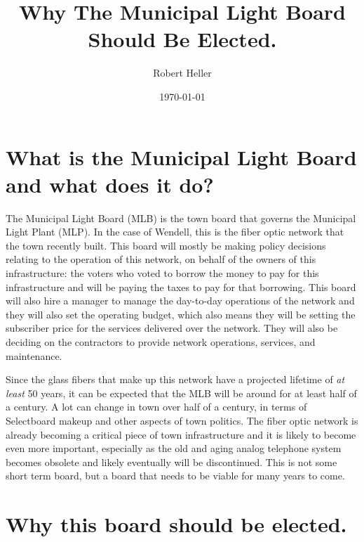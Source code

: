 \documentclass[12pt]{article}
\title{Why The Municipal Light Board Should Be Elected.}
\author{Robert Heller}
\date{\today}
\begin{document}
        
\maketitle

\tableofcontents

\section{What is the Municipal Light Board and what does it do?}

The Municipal Light Board (MLB) is the town board that governs the Municipal
Light Plant (MLP). In the case of Wendell, this is the fiber optic network
that the town recently built. This board will mostly be making policy decisions
relating to the operation of this network, on behalf of the owners of this
infrastructure: the voters who voted to borrow the money to pay for this
infrastructure and will be paying the taxes to pay for that borrowing. This
board will also hire a manager to manage the day-to-day operations of the
network and they will also set the operating budget, which also means they
will be setting the subscriber price for the services delivered over the
network. They will also be deciding on the contractors to provide network 
operations, services, and maintenance.

Since the glass fibers that make up this network have a projected lifetime of
\textit{at least} 50 years, it can be expected that the MLB will be around for
at least half of a century. A lot can change in town over half of a century,
in terms of Selectboard makeup and other aspects of town politics. The fiber
optic network is already becoming a critical piece of town infrastructure and
it is likely to become even more important, especially as the old and aging
analog telephone system becomes obsolete and likely eventually will be
discontinued. This is not some short term board, but a board that needs to be
viable for many years to come.

\section{Why this board should be elected.}
\end{document}
